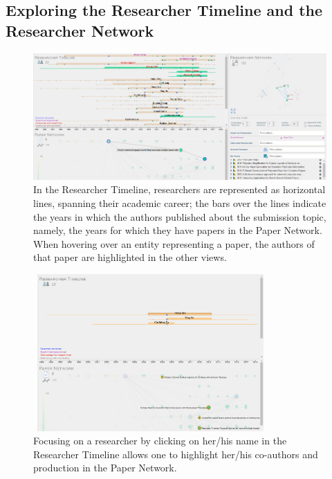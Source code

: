 \subsection*{Exploring the Researcher Timeline and the Researcher Network} 

\begin{figure}[!ht]
    \centering
    \includegraphics[width=\textwidth]{fig/timeline_paperhover.png}
    \caption{In the Researcher Timeline, researchers are represented as horizontal lines, spanning their academic career; the bars over the lines indicate the years in which the authors published about the submission topic, namely, the years for which they have papers in the Paper Network. When hovering over an entity representing a paper, the authors of that paper are highlighted in the other views.}
    \label{fig:overpaper}
\end{figure}

\begin{figure}[!ht]
    \centering
    \includegraphics[width=0.8\textwidth, height=6cm]{fig/timeline_researcherhover_cropped.png}
    \caption{Focusing on a researcher by clicking on her/his name in the Researcher Timeline allows one to highlight her/his co-authors and production in the Paper Network.}%
    \label{fig:authorclick}
\end{figure}

